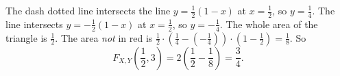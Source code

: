 \begin{exercise}
\begin{solution}
\begin{center}
            \end{center}
            The dash dotted line intersects the line $y = \frac{1}{2}(1-x)$ at $x=\frac{1}{2}$, so $y=\frac{1}{4}$. The line intersects $y=-\frac{1}{2}(1-x)$ at $x=\frac{1}{2}$, so $y=-\frac{1}{4}$.
            The whole area of the triangle is $\frac{1}{2}$. The area \textit{not} in red is $\frac{1}{2}\cdot(\frac{1}{4}-(-\frac{1}{4}))\cdot (1-\frac{1}{2}) = \frac{1}{8}$. So\
            \begin{equation*}
                F_{X,Y}\left(\frac{1}{2},3\right) =2\left(\frac{1}{2}-\frac{1}{8}\right)=\frac{3}{4}.
            \end{equation*}
\end{solution}
\end{exercise}


